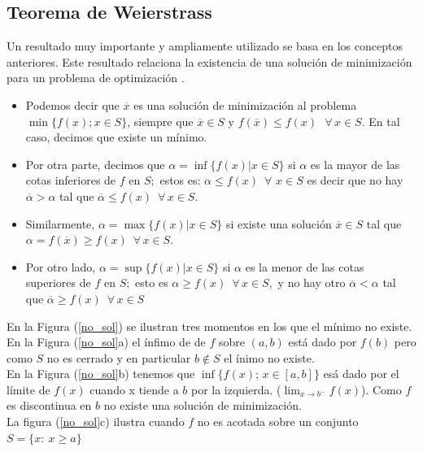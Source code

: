 \subsection{Teorema de Weierstrass}

Un resultado muy importante y ampliamente utilizado se basa en los conceptos anteriores. Este resultado relaciona la existencia de una 
soluci\'on de minimizaci\'on para un problema de optimizaci\'on \cite{no-lineal}. 

\begin{itemize}
   \item Podemos decir que $\overline{x}$ es una soluci\'on de minimizaci\'on al problema $\min \{f(x); x \in S \}$, siempre que 
	 $\overline{x} \in S $ y $ f(\overline{x}) \leqslant f(x)\,\,\,\, \forall \, x \in S$. En tal caso, decimos que existe un m\'inimo.
   \item Por otra parte, decimos que $ \alpha = \inf \{ f(x)| x \in S \} $ si $\alpha $ es la mayor de las cotas inferiores de $ f $ en 
	 $ S; $ estos es: $ \alpha \leqslant f(x) \,\,\, \forall \,\, x\in S $ es decir que no hay $\overline{\alpha} > \alpha$ 
	 tal que $ \overline{\alpha} \leqslant f(x) \,\,\, \forall \, x \in S. $
   \item Similarmente, $\alpha = \max \{ f(x)| x \in S \} $ si existe una soluci\'on $ \overline{x} \in S $ tal que 
	 $\alpha = f(\overline{x}) \geqslant f(x) \,\,\, \forall \, x \in S.$
   \item Por otro lado, $\alpha = \sup \{ f(x)| x \in S \} $ si $ \alpha $ es la menor de las cotas superiores de $ f $ en $ S; $ esto es 
	 $ \alpha \geqslant f(x) \,\,\, \forall \, x \in S, $ y no hay otro $\overline{\alpha} < \alpha $ tal que
	 $ \overline{\alpha} \geqslant f(x) \,\,\, \forall \, x \in S$
\end{itemize}


En la Figura (\ref{no_sol}) se ilustran tres momentos en los que el m\'inimo no existe. \\
En la Figura (\ref{no_sol}a) el \'infimo de de $ f $ sobre $(a, b) $ est\'a dado por $f(b)$ pero como $S$ no es cerrado y en particular
$b \notin S$ el \'inimo no existe.\\
En la Figura (\ref{no_sol}b) tenemos que $\inf \{ f(x);\, x \in [a, b]\} $ es\'a dado por el l\'imite de $f(x)$ cuando x tiende a $b$ por
la izquierda. ($\displaystyle{\lim_{x \rightarrow b^{-}} f(x)}$). Como $f$ es discontinua en $b$ no existe una soluci\'on de minimizaci\'on.\\
La figura (\ref{no_sol}c) ilustra cuando $f $ no es acotada sobre un conjunto $S = \{x: \ x \geqslant a \}$

